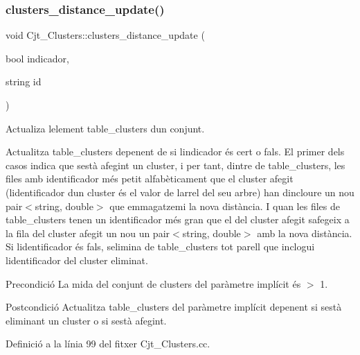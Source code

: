 \subsubsection{\texorpdfstring{clusters\+\_\+distance\+\_\+update()}{clusters\_distance\_update()}}
{\footnotesize\ttfamily void Cjt\+\_\+\+Clusters\+::clusters\+\_\+distance\+\_\+update (\begin{DoxyParamCaption}\item[{bool}]{indicador,  }\item[{string}]{id }\end{DoxyParamCaption})}



Actualiza l\textquotesingle{}element table\+\_\+clusters d\textquotesingle{}un conjunt. 

Actualitza table\+\_\+clusters depenent de si l\textquotesingle{}indicador és cert o fals. El primer dels casos indica que s\textquotesingle{}està afegint un cluster, i per tant, dintre de table\+\_\+clusters, les files amb identificador més petit alfabèticament que el cluster afegit (l\textquotesingle{}identificador d\textquotesingle{}un cluster és el valor de l\textquotesingle{}arrel del seu arbre) han d\textquotesingle{}incloure un nou pair$<$string, double$>$ que emmagatzemi la nova distància. I quan les files de table\+\_\+clusters tenen un identificador més gran que el del cluster afegit s\textquotesingle{}afegeix a la fila del cluster afegit un nou un pair$<$string, double$>$ amb la nova distància. Si l\textquotesingle{}identificador és fals, s\textquotesingle{}elimina de table\+\_\+clusters tot parell que inclogui l\textquotesingle{}identificador del cluster eliminat.

\begin{DoxyPrecond}{Precondició}
La mida del conjunt de clusters del paràmetre implícit és $>$ 1. 
\end{DoxyPrecond}
\begin{DoxyPostcond}{Postcondició}
Actualitza table\+\_\+clusters del paràmetre implícit depenent si s\textquotesingle{}està eliminant un cluster o si s\textquotesingle{}està afegint. 
\end{DoxyPostcond}


Definició a la línia 99 del fitxer Cjt\+\_\+\+Clusters.\+cc.


